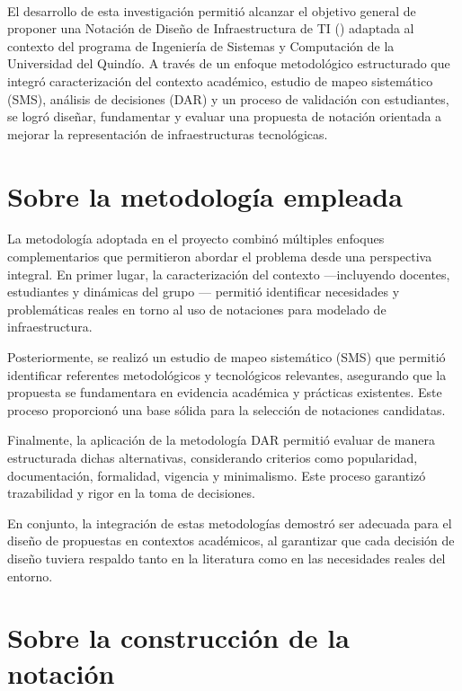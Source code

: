 \label{cap:conclusiones}
\mbox{}\\

El desarrollo de esta investigación permitió alcanzar el objetivo general de proponer una Notación de Diseño de Infraestructura de TI (\NDITI) adaptada al contexto del programa de Ingeniería de Sistemas y Computación de la Universidad del Quindío. A través de un enfoque metodológico estructurado que integró caracterización del contexto académico, estudio de mapeo sistemático (SMS), análisis de decisiones (DAR) y un proceso de validación con estudiantes, se logró diseñar, fundamentar y evaluar una propuesta de notación orientada a mejorar la representación de infraestructuras tecnológicas.

\section{Sobre la metodología empleada}
\noindent

La metodología adoptada en el proyecto combinó múltiples enfoques complementarios que permitieron abordar el problema desde una perspectiva integral. En primer lugar, la caracterización del contexto ---incluyendo docentes, estudiantes y dinámicas del grupo \GRID--- permitió identificar necesidades y problemáticas reales en torno al uso de notaciones para modelado de infraestructura.

Posteriormente, se realizó un estudio de mapeo sistemático (SMS) que permitió identificar referentes metodológicos y tecnológicos relevantes, asegurando que la propuesta se fundamentara en evidencia académica y prácticas existentes. Este proceso proporcionó una base sólida para la selección de notaciones candidatas.

Finalmente, la aplicación de la metodología DAR permitió evaluar de manera estructurada dichas alternativas, considerando criterios como popularidad, documentación, formalidad, vigencia y minimalismo. Este proceso garantizó trazabilidad y rigor en la toma de decisiones.

En conjunto, la integración de estas metodologías demostró ser adecuada para el diseño de propuestas en contextos académicos, al garantizar que cada decisión de diseño tuviera respaldo tanto en la literatura como en las necesidades reales del entorno.

\section{Sobre la construcción de la notación~\NDITI}
\noindent

